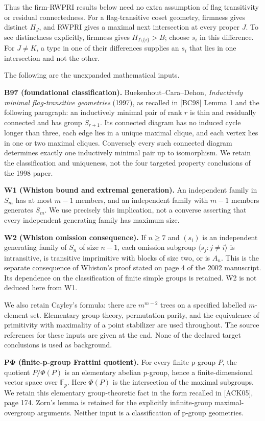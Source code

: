 \documentclass[
  11pt,
  a4paper,
]{article}
\begin{document}
Thus the firm-RWPRI results below need no extra assumption of flag
transitivity or residual connectedness. For a flag-transitive coset
geometry, firmness gives distinct \(H_J\), and RWPRI gives a maximal
next intersection at every proper \(J\). To see distinctness explicitly,
firmness gives \(H_{I\setminus\{i\}}>B\); choose \(s_i\) in this
difference. For \(J\ne K\), a type in one of their differences supplies
an \(s_i\) that lies in one intersection and not the other.

The following are the unexpanded mathematical inputs.

\textbf{B97 (foundational classification).} Buekenhout--Cara--Dehon,
\emph{Inductively minimal flag-transitive geometries} (1997), as
recalled in {[}BC98{]} Lemma 1 and the following paragraph: an
inductively minimal pair of rank \(r\) is thin and residually connected
and has group \(S_{r+1}\). Its connected diagram has no induced cycle
longer than three, each edge lies in a unique maximal clique, and each
vertex lies in one or two maximal cliques. Conversely every such
connected diagram determines exactly one inductively minimal pair up to
isomorphism. We retain the classification and uniqueness, not the four
targeted property conclusions of the 1998 paper.

\textbf{W1 (Whiston bound and extremal generation).} An independent
family in \(S_m\) has at most \(m-1\) members, and an independent family
with \(m-1\) members generates \(S_m\). We use precisely this
implication, not a converse asserting that every independent generating
family has maximum size.

\textbf{W2 (Whiston omission consequence).} If \(n\geq7\) and \((s_i)\)
is an independent generating family of \(S_n\) of size \(n-1\), each
omission subgroup \(\langle s_j:j\ne i\rangle\) is intransitive, is
transitive imprimitive with blocks of size two, or is \(A_n\). This is
the separate consequence of Whiston's proof stated on page 4 of the 2002
manuscript. Its dependence on the classification of finite simple groups
is retained. W2 is not deduced here from W1.

We also retain Cayley's formula: there are \(m^{m-2}\) trees on a
specified labelled \(m\)-element set. Elementary group theory,
permutation parity, and the equivalence of primitivity with maximality
of a point stabilizer are used throughout. The source references for
these inputs are given at the end. None of the declared target
conclusions is used as background.

\textbf{PΦ (finite-p-group Frattini quotient).} For every finite p-group
\(P\), the quotient \(P/\Phi(P)\) is an elementary abelian p-group,
hence a finite-dimensional vector space over \(\mathbb F_p\). Here
\(\Phi(P)\) is the intersection of the maximal subgroups. We retain this
elementary group-theoretic fact in the form recalled in {[}ACK05{]},
page 174. Zorn's lemma is retained for the explicitly infinite-group
maximal-overgroup arguments. Neither input is a classification of
p-group geometries.
\end{document}
